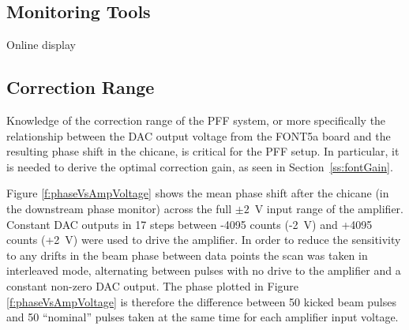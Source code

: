 \subsection{Monitoring Tools}
\label{ss:monTools}

Online display



\subsection{Correction Range}
\label{ss:corrRange}

Knowledge of the correction range of the PFF system, or more specifically the relationship between the DAC output voltage from the FONT5a board and the resulting phase shift in the chicane, is critical for the PFF setup. In particular, it is needed to derive the optimal
correction gain, as seen in Section~\ref{ss:fontGain}.


Figure \ref{f:phaseVsAmpVoltage} shows the mean phase shift after the chicane (in the downstream phase monitor) across the full \(\pm2\)~V input range of the amplifier. Constant DAC outputs in 17 steps between -4095 counts (-2~V) and +4095 counts (+2~V) were used to drive the amplifier. In order to reduce the sensitivity to any drifts in the beam phase between data points the scan was taken in interleaved mode, alternating between pulses with no drive to the amplifier and a constant non-zero DAC output. The phase plotted in Figure \ref{f:phaseVsAmpVoltage} is therefore the difference between 50 kicked beam pulses and 50 ``nominal'' pulses taken at the same time for each amplifier input voltage. 

